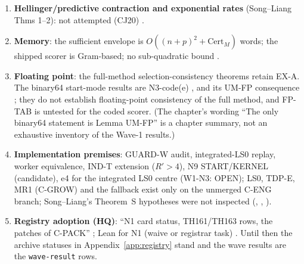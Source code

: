 \begin{enumerate}[label=F\arabic*.]
\item \textbf{Hellinger/predictive contraction and exponential rates} (Song--Liang Thms 1--2): not attempted (CJ20) .
\item \textbf{Memory}: the sufficient envelope is $O((n+p)^2+\mathrm{Cert}_M)$ words; the shipped scorer is Gram-based; no sub-quadratic bound .
\item \textbf{Floating point}: the full-method selection-consistency theorems retain EX-A. The binary64 start-mode results are N3-code(e) ,  and its UM-FP consequence ; they do not establish floating-point consistency of the full method, and FP-TAB is untested for the coded scorer. (The chapter's wording ``The only binary64 statement is Lemma UM-FP''  is a chapter summary, not an exhaustive inventory of the Wave-1 results.)
\item \textbf{Implementation premises}: GUARD-W audit, integrated-LS0 replay, worker equivalence, IND-T extension ($R'>4$), N9 START/KERNEL (candidate), e4 for the integrated LS0 centre (W1-N3: OPEN); LS0, TDP-E, MR1 (C-GROW) and the fallback exist only on the unmerged C-ENG branch; Song--Liang's Theorem~S hypotheses were not inspected  (, , ).
\item \textbf{Registry adoption (HQ)}: ``N1 card status, TH161/TH163 rows, the patches of C-PACK'' ; Lean for N1 (waive or registrar task) . Until then the archive statuses in Appendix~\ref{app:registry} stand and the wave results are the \texttt{wave-result} rows.
\end{enumerate}

